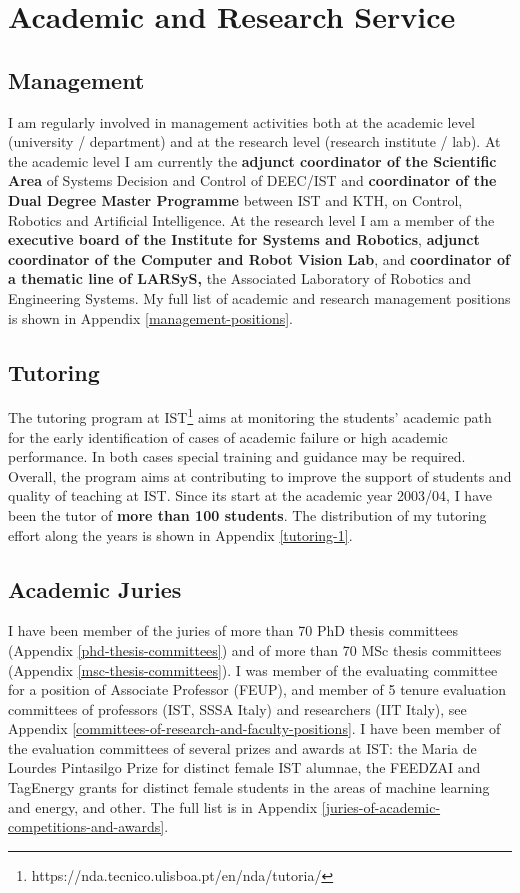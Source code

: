 \section{Academic and Research
Service}\label{academic-and-research-service}

\subsection{\texorpdfstring{Management }{Management }}\label{management}

I am regularly involved in management activities both at the academic
level (university / department) and at the research level (research
institute / lab). At the academic level I am currently the
\textbf{adjunct coordinator of the Scientific Area} of Systems Decision
and Control of DEEC/IST and \textbf{coordinator of the Dual Degree
Master Programme} between IST and KTH, on Control, Robotics and
Artificial Intelligence. At the research level I am a member of the
\textbf{executive board of the Institute for Systems and Robotics},
\textbf{adjunct coordinator of the Computer and Robot Vision Lab}, and
\textbf{coordinator of a thematic line of LARSyS,} the Associated
Laboratory of Robotics and Engineering Systems. My full list of academic
and research management positions is shown in Appendix \ref{management-positions}.

\subsection{Tutoring}\label{tutoring}

The tutoring program at IST\footnote{https://nda.tecnico.ulisboa.pt/en/nda/tutoria/}
aims at monitoring the students' academic path for the early
identification of cases of academic failure or high academic
performance. In both cases special training and guidance may be
required. Overall, the program aims at contributing to improve the
support of students and quality of teaching at IST. Since its start at
the academic year 2003/04, I have been the tutor of \textbf{more than
100 students}. The distribution of my tutoring effort along the years is
shown in Appendix \ref{tutoring-1}.

\subsection{Academic Juries}\label{academic-juries}

I have been member of the juries of more than 70 PhD thesis committees
(Appendix \ref{phd-thesis-committees}) and of more than 70 MSc thesis committees (Appendix
\ref{msc-thesis-committees}). I was member of the evaluating committee for a position of
Associate Professor (FEUP), and member of 5 tenure evaluation committees
of professors (IST, SSSA Italy) and researchers (IIT Italy), see
Appendix \ref{committees-of-research-and-faculty-positions}. I have been member of the evaluation committees of
several prizes and awards at IST: the Maria de Lourdes Pintasilgo Prize
for distinct female IST alumnae, the FEEDZAI and TagEnergy grants for
distinct female students in the areas of machine learning and energy,
and other. The full list is in Appendix \ref{juries-of-academic-competitions-and-awards}.
